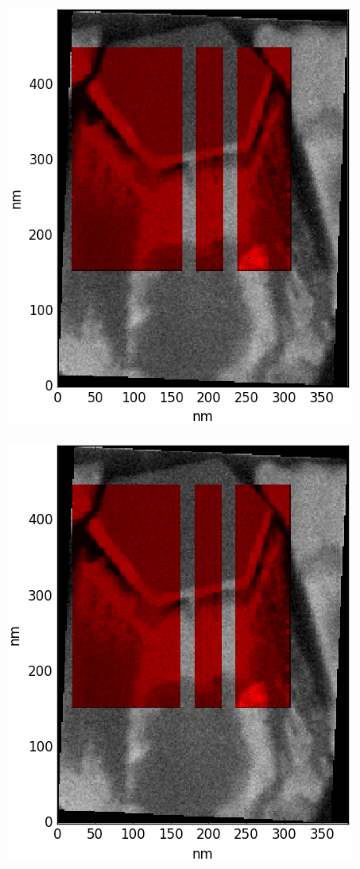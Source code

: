 \begin{figure}
	\centering
	\begin{subfigure}{0.25\textwidth}
		\includegraphics[width=\textwidth]{fig/other/edxinsped/orig5-2}
		\caption{}
		\label{fig:edxspedorig}
	\end{subfigure}%
	\hfill
	\begin{subfigure}{0.25\textwidth}
		\includegraphics[width=\textwidth]{fig/other/edxinsped/rot5-2}

\end{subfigure}
\end{figure}
